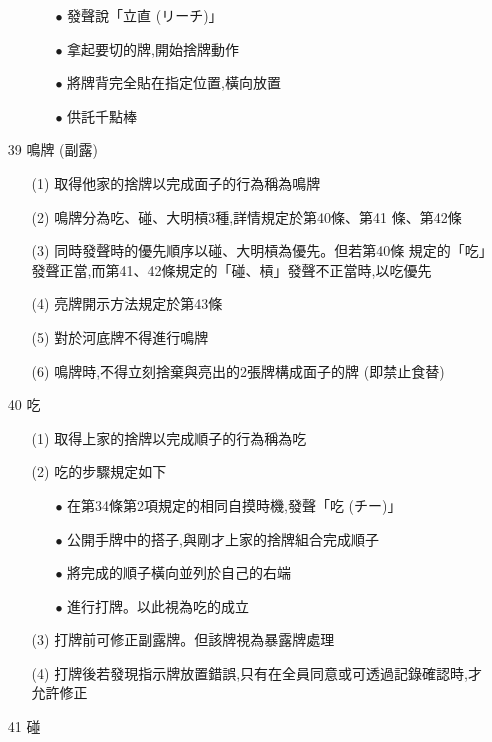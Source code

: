\documentclass[a4paper,12pt]{article}
\begin{document}
\begin{itemize}
\begin{itemize}
        \begin{itemize}
            \item[$\bullet$] 發聲說「立直 (リーチ)」
            \item[$\bullet$] 拿起要切的牌,開始捨牌動作
            \item[$\bullet$] 將牌背完全貼在指定位置,橫向放置
            \item[$\bullet$] 供託千點棒
        \end{itemize}
    \end{itemize}
    \item[39] 鳴牌 (副露)
    \begin{itemize}
        \item[(1)] 取得他家的捨牌以完成面子的行為稱為鳴牌
        \item[(2)] 鳴牌分為吃、碰、大明槓3種,詳情規定於第40條、第41 條、第42條
        \item[(3)] 同時發聲時的優先順序以碰、大明槓為優先。但若第40條 規定的「吃」發聲正當,而第41、42條規定的「碰、槓」發聲不正當時,以吃優先
        \item[(4)] 亮牌開示方法規定於第43條
        \item[(5)] 對於河底牌不得進行鳴牌
        \item[(6)] 鳴牌時,不得立刻捨棄與亮出的2張牌構成面子的牌 (即禁止食替)
    \end{itemize}
    \item[40] 吃
    \begin{itemize}
        \item[(1)] 取得上家的捨牌以完成順子的行為稱為吃
        \item[(2)] 吃的步驟規定如下
        \begin{itemize}
            \item[$\bullet$] 在第34條第2項規定的相同自摸時機,發聲「吃 (チー)」
            \item[$\bullet$] 公開手牌中的搭子,與剛才上家的捨牌組合完成順子
            \item[$\bullet$] 將完成的順子橫向並列於自己的右端
            \item[$\bullet$] 進行打牌。以此視為吃的成立
        \end{itemize}
        \item[(3)] 打牌前可修正副露牌。但該牌視為暴露牌處理
        \item[(4)] 打牌後若發現指示牌放置錯誤,只有在全員同意或可透過記錄確認時,才允許修正
    \end{itemize}
    \item[41] 碰

\end{itemize}
\end{document}
